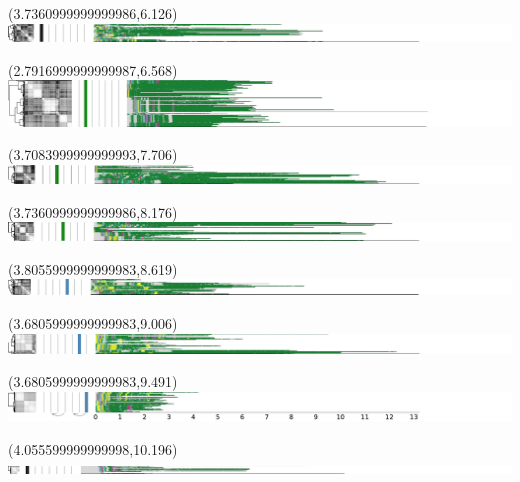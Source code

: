 \documentclass{article}
\begin{document}
\begin{textblock}{13}(3.7360999999999986,6.126)\includegraphics{haplotypes-constrained/6qtel_1-500K_1_12_12_rc-HG001.pdf}\end{textblock}
\begin{textblock}{13}(2.7916999999999987,6.568)\includegraphics{haplotypes-constrained/6qtel_1-500K_1_12_12_rc-HG002.pdf}\end{textblock}
\begin{textblock}{13}(3.7083999999999993,7.706)\includegraphics{haplotypes-constrained/6qtel_1-500K_1_12_12_rc-HG003.pdf}\end{textblock}
\begin{textblock}{13}(3.7360999999999986,8.176)\includegraphics{haplotypes-constrained/6qtel_1-500K_1_12_12_rc-HG004.pdf}\end{textblock}
\begin{textblock}{13}(3.8055999999999983,8.619)\includegraphics{haplotypes-constrained/6qtel_1-500K_1_12_12_rc-HG005.pdf}\end{textblock}
\begin{textblock}{13}(3.6805999999999983,9.006)\includegraphics{haplotypes-constrained/6qtel_1-500K_1_12_12_rc-HG006.pdf}\end{textblock}
\begin{textblock}{13}(3.6805999999999983,9.491)\includegraphics{haplotypes-constrained/6qtel_1-500K_1_12_12_rc-HG007.pdf}\end{textblock}
\begin{textblock}{13}(4.055599999999998,10.196)\includegraphics{haplotypes-constrained/chr7-HG001.pdf}\end{textblock}
\end{document}
